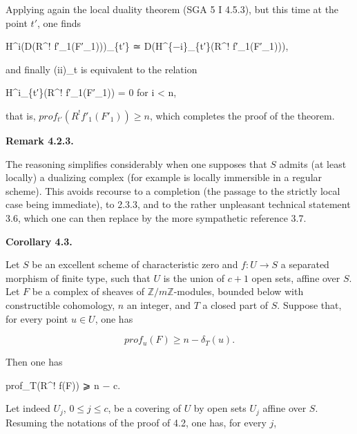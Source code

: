 \documentclass[
]{article}
\newenvironment{Shaded}{}{}
\newcommand{\NormalTok}[1]{#1}
\begin{document}
Applying again the local duality theorem (SGA 5 I 4.5.3), but this time
at the point \(t'\), one finds

\begin{Shaded}
\begin{Highlighting}[]
\NormalTok{H\^{}i(D(R\^{}! f′\_1(F′\_1)))\_\{t′\} ≃ D(H\^{}\{−i\}\_\{t′\}(R\^{}! f′\_1(F′\_1))),}
\end{Highlighting}
\end{Shaded}

and finally (ii)\_t is equivalent to the relation

\begin{Shaded}
\begin{Highlighting}[]
\NormalTok{H\^{}i\_\{t′\}(R\^{}! f′\_1(F′\_1)) = 0 for i \textless{} n,}
\end{Highlighting}
\end{Shaded}

that is, \(prof_{t'}(R^{!} f'_{1}(F'_{1})) \geqslant n\), which
completes the proof of the theorem.

\textbf{Remark 4.2.3.}

The reasoning simplifies considerably when one supposes that \(S\)
admits (at least locally) a dualizing complex (for example is locally
immersible in a regular scheme). This avoids recourse to a completion
(the passage to the strictly local case being immediate), to 2.3.3, and
to the rather unpleasant technical statement 3.6, which one can then
replace by the more sympathetic reference 3.7.

\textbf{Corollary 4.3.}

Let \(S\) be an excellent scheme of characteristic zero and
\(f : U \to S\) a separated morphism of finite type, such that \(U\) is
the union of \(c + 1\) open sets, affine over \(S\). Let \(F\) be a
complex of sheaves of \(\mathbb{Z}/m\mathbb{Z}\)-modules, bounded below
with constructible cohomology, \(n\) an integer, and \(T\) a closed part
of \(S\). Suppose that, for every point \(u \in U\), one has

\[
prof_{u}(F) \geqslant n - \delta_{T}(u).
\]

Then one has

\begin{Shaded}
\begin{Highlighting}[]
\NormalTok{prof\_T(R\^{}! f(F)) ⩾ n − c.}
\end{Highlighting}
\end{Shaded}

Let indeed \(U_{j}\), \(0 \leqslant j \leqslant c\), be a covering of
\(U\) by open sets \(U_{j}\) affine over \(S\). Resuming the notations
of the proof of 4.2, one has, for every \(j\),
\end{document}
